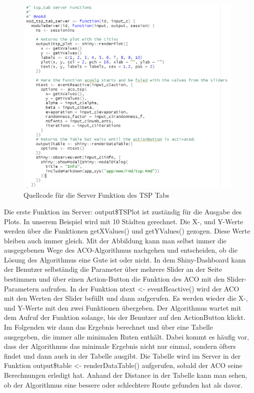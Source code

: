 \begin{figure}[H]
 \centering
 \includegraphics[scale=.7]{"images/05_Tsp/server_mod_tsp_tab.png"}
 \caption{Quellcode für die Server Funktion des TSP Tabs}
 \label{fig:server_mod_tsp_tab}
\end{figure}
Die erste Funktion im Server: output\$TSPlot ist zuständig für die Ausgabe des Plots.
\newline 
In unserem Beispiel wird mit 10 Städten gerechnet. Die X-, und Y-Werte werden über die Funktionen getXValues() und getYValues() gezogen. Diese Werte bleiben auch immer gleich. Mit der Abbildung kann man selbst immer die ausgegebenen Wege des ACO-Algorithmus nachgehen und entscheiden, ob die Lösung des Algorithmus eine Gute ist oder nicht.
\newline
In dem Shiny-Dashboard kann der Benutzer selbständig die Parameter über mehrere Slider an der Seite bestimmen und über einen Action-Button die Funktion des ACO mit den Slider-Parametern aufrufen. In der Funktion ntext <- eventReactive() wird der ACO mit den Werten der Slider befüllt und dann aufgerufen. Es werden wieder die X-, und Y-Werte mit den zwei Funktionen übergeben. Der Algorithmus wartet mit dem Aufruf der Funktion solange, bis der Benutzer auf den ActionButton klickt. 
\newline 
Im Folgenden wir dann das Ergebnis berechnet und über eine Tabelle ausgegeben, die immer alle minimalen Ruten enthält. Dabei kommt es häufig vor, dass der Algorithmus das minimale Ergebnis nicht nur einmal, sondern öfters findet und dann auch in der Tabelle ausgibt. Die Tabelle wird im Server in der Funktion output\$table <- renderDataTable() aufgerufen, sobald der ACO seine Berechnungen erledigt hat. Anhand der Distance in der Tabelle kann man sehen, ob der Algorithmus eine bessere oder schlechtere Route gefunden hat als davor.
